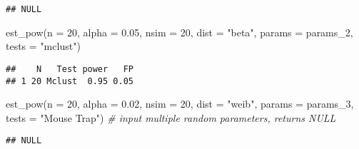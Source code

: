 \documentclass[
]{article}
\newenvironment{Shaded}{\begin{snugshade}}{\end{snugshade}}
\newcommand{\AttributeTok}[1]{\textcolor[rgb]{0.77,0.63,0.00}{#1}}
\newcommand{\CommentTok}[1]{\textcolor[rgb]{0.56,0.35,0.01}{\textit{#1}}}
\newcommand{\DecValTok}[1]{\textcolor[rgb]{0.00,0.00,0.81}{#1}}
\newcommand{\FloatTok}[1]{\textcolor[rgb]{0.00,0.00,0.81}{#1}}
\newcommand{\FunctionTok}[1]{\textcolor[rgb]{0.00,0.00,0.00}{#1}}
\newcommand{\NormalTok}[1]{#1}
\newcommand{\StringTok}[1]{\textcolor[rgb]{0.31,0.60,0.02}{#1}}
\begin{document}
\begin{verbatim}
## NULL
\end{verbatim}

\begin{Shaded}
\begin{Highlighting}[]
\FunctionTok{est\_pow}\NormalTok{(}\AttributeTok{n =} \DecValTok{20}\NormalTok{, }\AttributeTok{alpha =} \FloatTok{0.05}\NormalTok{, }\AttributeTok{nsim =} \DecValTok{20}\NormalTok{, }\AttributeTok{dist =} \StringTok{"beta"}\NormalTok{, }\AttributeTok{params =}\NormalTok{ params\_2,  }\AttributeTok{tests =} \StringTok{"mclust"}\NormalTok{) }
\end{Highlighting}
\end{Shaded}

\begin{verbatim}
##    N   Test power   FP
## 1 20 Mclust  0.95 0.05
\end{verbatim}

\begin{Shaded}
\begin{Highlighting}[]
\FunctionTok{est\_pow}\NormalTok{(}\AttributeTok{n =} \DecValTok{20}\NormalTok{, }\AttributeTok{alpha =} \FloatTok{0.02}\NormalTok{, }\AttributeTok{nsim =} \DecValTok{20}\NormalTok{, }\AttributeTok{dist =} \StringTok{"weib"}\NormalTok{, }\AttributeTok{params =}\NormalTok{ params\_3,  }\AttributeTok{tests =} \StringTok{"Mouse Trap"}\NormalTok{) }\CommentTok{\# input multiple random parameters, returns NULL}
\end{Highlighting}
\end{Shaded}

\begin{verbatim}
## NULL
\end{verbatim}
\end{document}
